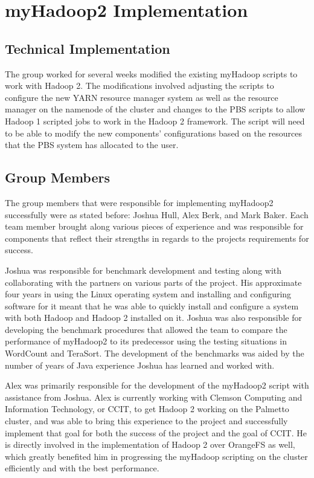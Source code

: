 \documentclass[conference]{IEEEtran}
\begin{document}
	\section{myHadoop2 Implementation}
		\subsection{Technical Implementation}
			The group worked for several weeks modified the existing myHadoop scripts to work with Hadoop 2. The modifications involved adjusting the scripts to configure the new YARN resource manager system as well as the resource manager on the namenode of the cluster and changes to the PBS scripts to allow Hadoop 1 scripted jobs to work in the Hadoop 2 framework. The script will need to be able to modify the new components’ configurations based on the resources that the PBS system has allocated to the user.

		\subsection{Group Members}
			The group members that were responsible for implementing myHadoop2 successfully were as stated before: Joshua Hull, Alex Berk, and Mark Baker. Each team member brought along various pieces of experience and was responsible for components that reflect their strengths in regards to the projects requirements for success. 

			Joshua was responsible for benchmark development and testing along with collaborating with the partners on various parts of the project. His approximate four years in using the Linux operating system and installing and configuring software for it meant that he was able to quickly install and configure a system with both Hadoop and Hadoop 2 installed on it. Joshua was also responsible for developing the benchmark procedures that allowed the team to compare the performance of myHadoop2 to its predecessor using the testing situations in WordCount and TeraSort. The development of the benchmarks was aided by the number of years of Java experience Joshua has learned and worked with.

			Alex was primarily responsible for the development of the myHadoop2 script with assistance from Joshua. Alex is currently working with Clemson Computing and Information Technology, or CCIT, to get Hadoop 2 working on the Palmetto cluster, and was able to bring this experience to the project and successfully implement that goal for both the success of the project and the goal of CCIT. He is directly involved in the implementation of Hadoop 2 over OrangeFS as well, which greatly benefited him in progressing the myHadoop scripting on the cluster efficiently and with the best performance.
\end{document}
